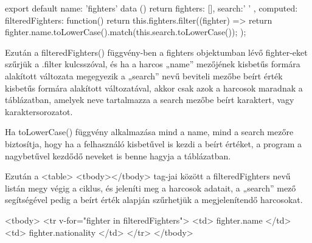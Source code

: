 \begin{cpp}
export default {
  name: 'fighters'
   data () {
    return {
      fighters: [],
      search:' '  }},
computed: {
    	filteredFighters: function(){
    		return this.fighters.filter((fighter) => {
return fighter.name.toLowerCase().match(this.search.toLowerCase());
    		});}}
}
\end{cpp}

Ezután a filteredFighters() függvény-ben a fighters objektumban lévő fighter-eket szűrjük a .filter kulcsszóval, és ha a harcos „name” mezőjének kisbetűs formára alakított változata megegyezik a „search” nevű beviteli mezőbe beírt érték kisbetűs formára alakított változatával, akkor csak azok a harcosok maradnak a táblázatban, amelyek neve tartalmazza a search mezőbe beírt karaktert, vagy karaktersorozatot.

Ha toLowerCase() függvény alkalmazása mind a name, mind a search mezőre biztosítja, hogy ha a felhasználó kisbetűvel is kezdi a beírt értéket, a program a nagybetűvel kezdődő neveket is benne hagyja a táblázatban.

Ezután a <table> <tbody></tbody> tag-jai között a filteredFighters nevű listán megy végig a ciklus, és jeleníti meg a harcosok adatait, a „search” mező segítségével pedig a beírt érték alapján szűrhetjük a megjelenítendő harcosokat.

\begin{cpp}
<tbody>
	<tr v-for="fighter in filteredFighters">
    	<td>{{ fighter.name }}</td>
          <td>{{ fighter.nationality }}</td>
        </tr>
</tbody>
\end{cpp}
\newpage
{}


